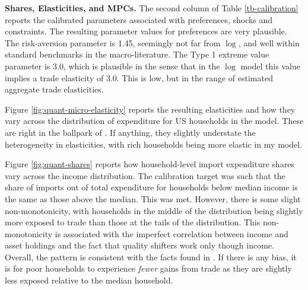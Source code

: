 \documentclass[12pt,pdftex]{article}
\begin{document}
\begin{onehalfspacing}
\textbf{Shares, Elasticities, and MPCs.} The second column of Table \ref{tb-calibration} reports the calibrated parameters associated with preferences, shocks and constraints. The resulting parameter values for preferences are very plausible. The risk-aversion parameter is 1.45, seemingly not far from $\log$, and well within standard benchmarks in the macro-literature. The Type 1 extreme value parameter is 3.0, which is plausible in the sense that in the $\log$ model this value implies a trade elasticity of 3.0. This is low, but in the range of estimated aggregate trade elasticities.

Figure \ref{fig:quant-micro-elasticity} reports the resulting elasticities and how they vary across the distribution of expenditure for US households in the model. These are right in the ballpark of \citet{auer2022unequal}. If anything, they slightly understate the heterogeneity in elasticities, with rich households being more elastic in my model.

Figure \ref{fig:quant-shares} reports how household-level import expenditure shares vary across the income distribution. The calibration target was such that the share of imports out of total expenditure for households below median income is the same as those above the median. This was met. However, there is some slight non-monotonicity, with households in the middle of the distribution being slightly more exposed to trade than those at the tails of the distribution. This non-monotonicity is associated with the imperfect correlation between income and asset holdings and the fact that quality shifters work only though income. Overall, the pattern is consistent with the facts found in \citet{borusyak2021distributional}. If there is any bias, it is for poor households to experience \emph{fewer} gains from trade as they are slightly less exposed relative to the median household.


\end{onehalfspacing}
\end{document}
